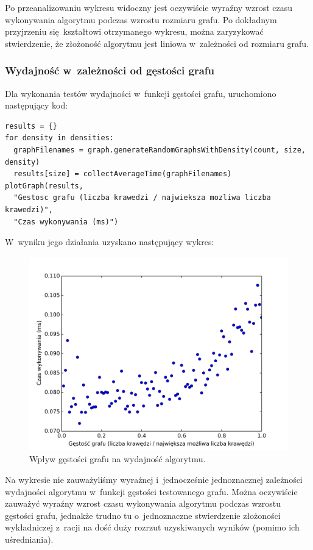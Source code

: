 \documentclass[11pt,a4paper]{article}
\begin{document}
Po przeanalizowaniu wykresu widoczny jest oczywiście wyraźny wzrost czasu wykonywania algorytmu podczas wzrostu rozmiaru grafu. Po dokładnym przyjrzeniu się kształtowi otrzymanego wykresu, można zaryzykować stwierdzenie, że złożoność algorytmu jest liniowa w~zależności od rozmiaru grafu.

\newpage
\subsubsection{Wydajność w~zależności od gęstości grafu}
Dla wykonania testów wydajności w~funkcji gęstości grafu, uruchomiono następujący kod:\\

\begin{lstlisting}[caption = Testy wydajności w~zależności od gęstości grafu]
results = {}
for density in densities:
  graphFilenames = graph.generateRandomGraphsWithDensity(count, size, density)
  results[size] = collectAverageTime(graphFilenames)
plotGraph(results,
  "Gestosc grafu (liczba krawedzi / najwieksza mozliwa liczba krawedzi)",
  "Czas wykonywania (ms)")
\end{lstlisting}

W~wyniku jego działania uzyskano następujący wykres:

\begin{figure}[H]
  \includegraphics[trim = 0mm 2mm 0mm 12mm, clip, width=14cm]{img/density.pdf}
  \caption{Wpływ gęstości grafu na wydajność algorytmu.}
\end{figure}

Na wykresie nie zauważyliśmy wyraźnej i~jednocześnie jednoznacznej zależności wydajności algorytmu w~funkcji gęstości testowanego grafu. Można oczywiście zauważyć wyraźny wzrost czasu wykonywania algorytmu podczas wzrostu gęstości grafu, jednakże trudno tu o~jednoznaczne stwierdzenie złożoności wykładniczej z~racji na dość duży rozrzut uzyskiwanych wyników (pomimo ich uśredniania).
\end{document}
